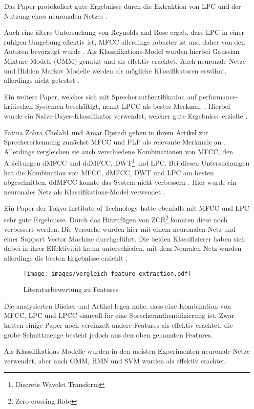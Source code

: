 Das Paper  protokoliert gute Ergebnisse durch die Extraktion von \ac{LPC} und der Nutzung eines neuronalen Netzes \autocite[vgl.][S. 9]{kumar_rajeev_multilingual_nodate}.

Auch eine ältere Untersuchung von Reynolds and Rose ergab, dass \ac{LPC} in einer ruhigen Umgebung effektiv ist, \ac{MFCC} allerdings robuster ist und daher von den Autoren bevorzugt wurde \autocite[vgl.][S. 2f]{reynolds_robust_1995}.
Als Klassifikations-Model wurden hierbei Gaussian Mixture Models (GMM) genutzt und als effektiv erachtet.
Auch neuronale Netze und Hidden Markov Modelle werden als mögliche Klassifikatoren erwähnt, allerdings nicht getestet \autocite[vgl.][S. 2f, 11]{reynolds_robust_1995}.

Ein weiters Paper, welches sich mit Sprecherauthentifikation auf performance-kritischen Systemen beschäftigt, nennt \ac{LPCC} als bestes Merkmal. \autocite[vgl.][S. 7]{thullier_text-independent_2017}.
Hierbei wurde ein Naive-Bayes-Klassifikator verwendet, welcher gute Ergebnisse erzielte \autocite[vgl.][S. 18f]{thullier_text-independent_2017}.

Fatma Zohra Chelali1 und Amar Djeradi geben in ihrem Artikel zur Sprechererkennung zunächst \ac{MFCC} und PLP als relevante Merkmale an \autocite[vgl.][S. 276]{chelali_text_2017}.
Allerdings vergleichen sie auch verschiedene Kombinationen von \ac{MFCC}, den Ableitungen \ac{dMFCC} und \ac{ddMFCC}, DWT\footnote{Discrete Wavelet Transform} und \ac{LPC}.
Bei diesen Untersuchungen hat die Kombination von \ac{MFCC}, \ac{dMFCC}, DWT und \ac{LPC} am besten abgeschnitten.
\ac{ddMFCC} konnte das System nicht verbessern \autocite[vgl.][S. 276, 739]{chelali_text_2017}.
Hier wurde ein neuronales Netz als Klassifikations-Model verwendet \autocite[vgl.][S. 735]{chelali_text_2017}.

Ein Paper der Tokyo Institute of Technology hatte ebenfalls mit \ac{MFCC} und \ac{LPC} sehr gute Ergebnisse.
Durch das Hinzufügen von ZCR\footnote{Zero-crossing Rate} konnten diese noch verbessert werden.
Die Versuche wurden hier mit einem neuronalen Netz und einer Support Vector Machine durchgeführt.
Die beiden Klassifizierer haben sich dabei in ihrer Effektivität kaum unterschieden, mit dem Neuralen Netz wurden allerdings die besten Ergebnisse erziehlt \autocite[vgl.][S. 4]{neha_chauhan_2019_2019}.

\begin{figure}
    \centering
    \texttt{[image: images/vergleich-feature-extraction.pdf]}
    \caption{Literaturbewertung zu Features}
    \label{fig:vergleichFeatureExtraction}
\end{figure}

Die analysierten Bücher und Artikel legen nahe, dass eine Kombination von \ac{MFCC}, \ac{LPC} und \ac{LPCC} sinnvoll für eine Sprecherauthentifizierung ist.
Zwar hatten einige Paper noch vereinzelt andere Features als effektiv erachtet, die grobe Schnittmenge besteht jedoch aus den oben genannten Features.

Als Klassifikations-Modelle wurden in den meisten Experimenten neuronale Netze verwendet, aber auch GMM, HMN und SVM wurden als effektiv erachtet.